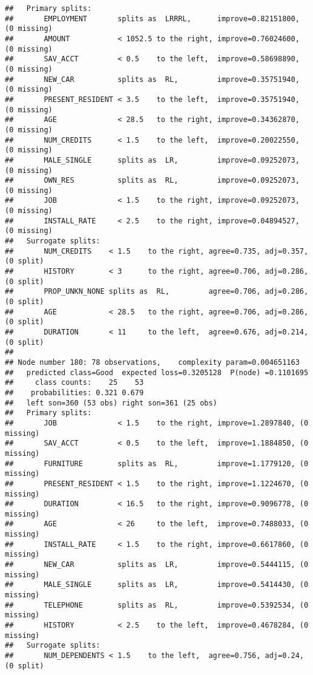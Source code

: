 \documentclass[
]{article}
\begin{document}
\begin{verbatim}
##   Primary splits:
##       EMPLOYMENT       splits as  LRRRL,      improve=0.82151800, (0 missing)
##       AMOUNT           < 1052.5 to the right, improve=0.76024600, (0 missing)
##       SAV_ACCT         < 0.5    to the left,  improve=0.58698890, (0 missing)
##       NEW_CAR          splits as  RL,         improve=0.35751940, (0 missing)
##       PRESENT_RESIDENT < 3.5    to the left,  improve=0.35751940, (0 missing)
##       AGE              < 28.5   to the right, improve=0.34362870, (0 missing)
##       NUM_CREDITS      < 1.5    to the left,  improve=0.20022550, (0 missing)
##       MALE_SINGLE      splits as  LR,         improve=0.09252073, (0 missing)
##       OWN_RES          splits as  RL,         improve=0.09252073, (0 missing)
##       JOB              < 1.5    to the right, improve=0.09252073, (0 missing)
##       INSTALL_RATE     < 2.5    to the right, improve=0.04894527, (0 missing)
##   Surrogate splits:
##       NUM_CREDITS    < 1.5    to the right, agree=0.735, adj=0.357, (0 split)
##       HISTORY        < 3      to the right, agree=0.706, adj=0.286, (0 split)
##       PROP_UNKN_NONE splits as  RL,         agree=0.706, adj=0.286, (0 split)
##       AGE            < 28.5   to the right, agree=0.706, adj=0.286, (0 split)
##       DURATION       < 11     to the left,  agree=0.676, adj=0.214, (0 split)
## 
## Node number 180: 78 observations,    complexity param=0.004651163
##   predicted class=Good  expected loss=0.3205128  P(node) =0.1101695
##     class counts:    25    53
##    probabilities: 0.321 0.679 
##   left son=360 (53 obs) right son=361 (25 obs)
##   Primary splits:
##       JOB              < 1.5    to the right, improve=1.2897840, (0 missing)
##       SAV_ACCT         < 0.5    to the left,  improve=1.1884850, (0 missing)
##       FURNITURE        splits as  RL,         improve=1.1779120, (0 missing)
##       PRESENT_RESIDENT < 1.5    to the right, improve=1.1224670, (0 missing)
##       DURATION         < 16.5   to the right, improve=0.9096778, (0 missing)
##       AGE              < 26     to the left,  improve=0.7488033, (0 missing)
##       INSTALL_RATE     < 1.5    to the right, improve=0.6617860, (0 missing)
##       NEW_CAR          splits as  LR,         improve=0.5444115, (0 missing)
##       MALE_SINGLE      splits as  LR,         improve=0.5414430, (0 missing)
##       TELEPHONE        splits as  RL,         improve=0.5392534, (0 missing)
##       HISTORY          < 2.5    to the left,  improve=0.4678284, (0 missing)
##   Surrogate splits:
##       NUM_DEPENDENTS < 1.5    to the left,  agree=0.756, adj=0.24, (0 split)

\end{verbatim}
\end{document}
